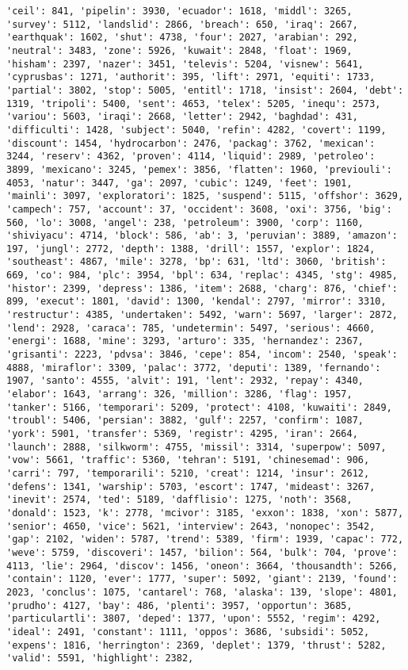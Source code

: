 \documentclass[11pt]{article}
\begin{document}
\begin{Verbatim}[commandchars=\\\{\}]
'ceil': 841, 'pipelin': 3930, 'ecuador': 1618, 'middl': 3265, 'survey': 5112, 'landslid': 2866, 'breach': 650, 'iraq': 2667, 'earthquak': 1602, 'shut': 4738, 'four': 2027, 'arabian': 292, 'neutral': 3483, 'zone': 5926, 'kuwait': 2848, 'float': 1969, 'hisham': 2397, 'nazer': 3451, 'televis': 5204, 'visnew': 5641, 'cyprusbas': 1271, 'authorit': 395, 'lift': 2971, 'equiti': 1733, 'partial': 3802, 'stop': 5005, 'entitl': 1718, 'insist': 2604, 'debt': 1319, 'tripoli': 5400, 'sent': 4653, 'telex': 5205, 'inequ': 2573, 'variou': 5603, 'iraqi': 2668, 'letter': 2942, 'baghdad': 431, 'difficulti': 1428, 'subject': 5040, 'refin': 4282, 'covert': 1199, 'discount': 1454, 'hydrocarbon': 2476, 'packag': 3762, 'mexican': 3244, 'reserv': 4362, 'proven': 4114, 'liquid': 2989, 'petroleo': 3899, 'mexicano': 3245, 'pemex': 3856, 'flatten': 1960, 'previouli': 4053, 'natur': 3447, 'ga': 2097, 'cubic': 1249, 'feet': 1901, 'mainli': 3097, 'exploratori': 1825, 'suspend': 5115, 'offshor': 3629, 'campech': 757, 'account': 37, 'occident': 3608, 'oxi': 3756, 'big': 560, 'lo': 3008, 'angel': 238, 'petroleum': 3900, 'corp': 1160, 'shiviyacu': 4714, 'block': 586, 'ab': 3, 'peruvian': 3889, 'amazon': 197, 'jungl': 2772, 'depth': 1388, 'drill': 1557, 'explor': 1824, 'southeast': 4867, 'mile': 3278, 'bp': 631, 'ltd': 3060, 'british': 669, 'co': 984, 'plc': 3954, 'bpl': 634, 'replac': 4345, 'stg': 4985, 'histor': 2399, 'depress': 1386, 'item': 2688, 'charg': 876, 'chief': 899, 'execut': 1801, 'david': 1300, 'kendal': 2797, 'mirror': 3310, 'restructur': 4385, 'undertaken': 5492, 'warn': 5697, 'larger': 2872, 'lend': 2928, 'caraca': 785, 'undetermin': 5497, 'serious': 4660, 'energi': 1688, 'mine': 3293, 'arturo': 335, 'hernandez': 2367, 'grisanti': 2223, 'pdvsa': 3846, 'cepe': 854, 'incom': 2540, 'speak': 4888, 'miraflor': 3309, 'palac': 3772, 'deputi': 1389, 'fernando': 1907, 'santo': 4555, 'alvit': 191, 'lent': 2932, 'repay': 4340, 'elabor': 1643, 'arrang': 326, 'million': 3286, 'flag': 1957, 'tanker': 5166, 'temporari': 5209, 'protect': 4108, 'kuwaiti': 2849, 'troubl': 5406, 'persian': 3882, 'gulf': 2257, 'confirm': 1087, 'york': 5901, 'transfer': 5369, 'registr': 4295, 'iran': 2664, 'launch': 2888, 'silkworm': 4755, 'missil': 3314, 'superpow': 5097, 'vow': 5661, 'traffic': 5360, 'tehran': 5191, 'chinesemad': 906, 'carri': 797, 'temporarili': 5210, 'creat': 1214, 'insur': 2612, 'defens': 1341, 'warship': 5703, 'escort': 1747, 'mideast': 3267, 'inevit': 2574, 'ted': 5189, 'dafflisio': 1275, 'noth': 3568, 'donald': 1523, 'k': 2778, 'mcivor': 3185, 'exxon': 1838, 'xon': 5877, 'senior': 4650, 'vice': 5621, 'interview': 2643, 'nonopec': 3542, 'gap': 2102, 'widen': 5787, 'trend': 5389, 'firm': 1939, 'capac': 772, 'weve': 5759, 'discoveri': 1457, 'bilion': 564, 'bulk': 704, 'prove': 4113, 'lie': 2964, 'discov': 1456, 'oneon': 3664, 'thousandth': 5266, 'contain': 1120, 'ever': 1777, 'super': 5092, 'giant': 2139, 'found': 2023, 'conclus': 1075, 'cantarel': 768, 'alaska': 139, 'slope': 4801, 'prudho': 4127, 'bay': 486, 'plenti': 3957, 'opportun': 3685, 'particulartli': 3807, 'deped': 1377, 'upon': 5552, 'regim': 4292, 'ideal': 2491, 'constant': 1111, 'oppos': 3686, 'subsidi': 5052, 'expens': 1816, 'herrington': 2369, 'deplet': 1379, 'thrust': 5282, 'valid': 5591, 'highlight': 2382, 
\end{Verbatim}
\end{document}

